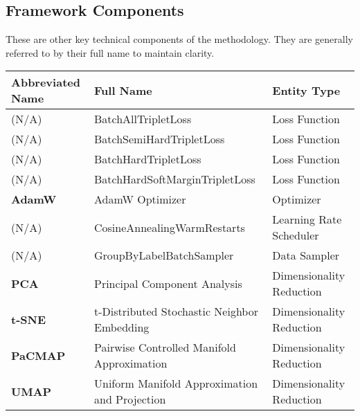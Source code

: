 \documentclass[11pt]{article}
\begin{document}
\subsection*{Framework Components}
These are other key technical components of the methodology. They are generally referred to by their full name to maintain clarity.
\begin{table}[h!]
\centering
\begin{tabular}{@{}p{}p{}p{}@{}}
\toprule
\textbf{Abbreviated Name} & \textbf{Full Name}                                      & \textbf{Entity Type}           \\ \midrule
(N/A)                     & BatchAllTripletLoss                                     & Loss Function                \\
(N/A)                     & BatchSemiHardTripletLoss                                & Loss Function                \\
(N/A)                     & BatchHardTripletLoss                                    & Loss Function                \\
(N/A)                     & BatchHardSoftMarginTripletLoss                          & Loss Function                \\
\textbf{AdamW}            & AdamW Optimizer                                         & Optimizer                    \\
(N/A)                     & CosineAnnealingWarmRestarts                             & Learning Rate Scheduler      \\
(N/A)                     & GroupByLabelBatchSampler                                & Data Sampler                 \\
\textbf{PCA}              & Principal Component Analysis                            & Dimensionality Reduction     \\
\textbf{t-SNE}            & t-Distributed Stochastic Neighbor Embedding             & Dimensionality Reduction     \\
\textbf{PaCMAP}           & Pairwise Controlled Manifold Approximation              & Dimensionality Reduction     \\
\textbf{UMAP}             & Uniform Manifold Approximation and Projection           & Dimensionality Reduction     \\ \bottomrule
\end{tabular}
\end{table}
\end{document}
